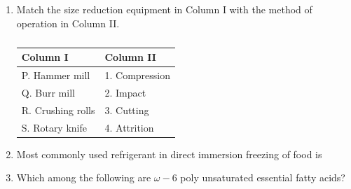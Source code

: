 \documentclass[journal,12pt,onecolumn]{IEEEtran}
\theoremstyle{remark}
\begin{document}
\begin{enumerate}
    \item Match the size reduction equipment in Column I with the method of operation in Column II.

    \hfill{}
    \begin{table}[h!]
    \centering
    \caption*{}
    \label{tab:q115}
    \begin{tabular}{ll}
    \hline
    \textbf{Column I} & \textbf{Column II} \\
    \hline
    P. Hammer mill & 1. Compression \\
    Q. Burr mill & 2. Impact \\
    R. Crushing rolls & 3. Cutting \\
    S. Rotary knife & 4. Attrition \\
    \hline
    \end{tabular}
    \end{table}
    \begin{enumerate}
    \end{enumerate}

    \item Most commonly used refrigerant in direct immersion freezing of food is

    \hfill{}
    \begin{enumerate}
    \end{enumerate}

    \item Which among the following are $\omega-6$ poly unsaturated essential fatty acids?

    \hfill{}
    \begin{enumerate}
    \end{enumerate}


\end{enumerate}
\end{document}
